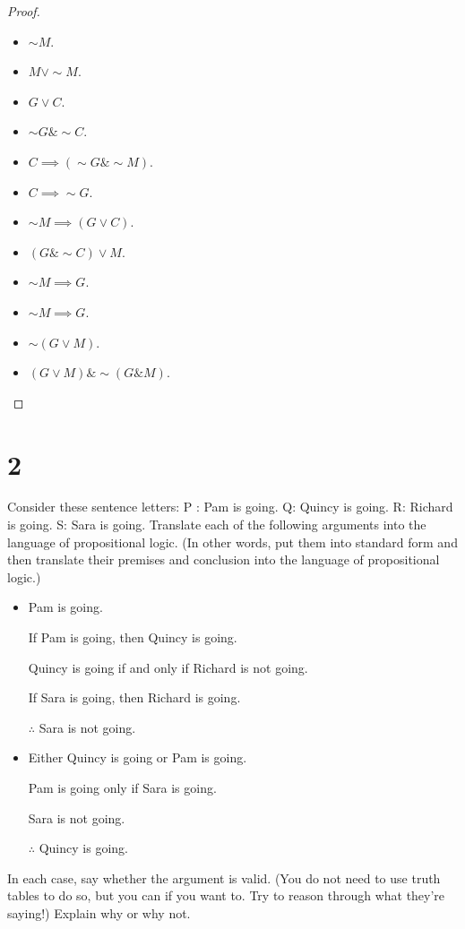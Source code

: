 \documentclass{article}
\begin{document}
\begin{proof}

    \hfill

    \begin{itemize}
        \item[a)]$\sim M$.
        \item[b)] $M \vee \sim M$.
        \item[c)] $G \vee C$.
        \item[d)] $\sim G\& \sim C$.
        \item[e)] $C \implies (\sim G\& \sim M)$.
        \item[f)] $C \implies \sim G$.
        \item[g)] $\sim M \implies (G \vee C)$.
        \item[h)] $(G \& \sim C)\vee M$.
        \item[i)] $\sim M\implies G$.
        \item[j)] $\sim M\implies G$.
        \item[k)] $\sim (G\vee M)$.
        \item[l)] $(G \vee M)\& \sim (G\& M)$.           
    \end{itemize}
\end{proof}

\hfill

\section*{2}
\begin{ques}\label{q2}
Consider these sentence letters: P : Pam is going. Q: Quincy is going. R: Richard is going. S: Sara is going. Translate each of the following arguments into the language of propositional logic. (In other words, put them into standard form and then translate their premises and conclusion into the language of propositional logic.)

\begin{itemize}
    \item[a)] Pam is going. 
    
    If Pam is going, then Quincy is going. 
    
    Quincy is going if and only if Richard is not going. 
    
    If Sara is going, then Richard is going. 
    
    $\therefore$ Sara is not going.
    \item[b)] Either Quincy is going or Pam is going. 
    
    Pam is going only if Sara is going. 
    
    Sara is not going. 
    
    $\therefore$ Quincy is going.
\end{itemize}
In each case, say whether the argument is valid. (You do not need to use truth tables to do so, but you can if you want to. Try to reason through what they’re saying!) Explain why or why not.
\end{ques}
\end{document}
